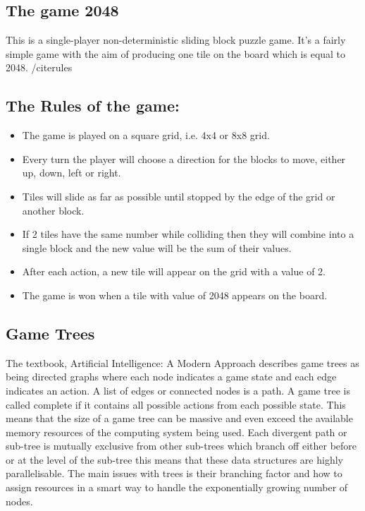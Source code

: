 \documentclass[a4paper]{article}
\begin{document}
\subsection{The game 2048}
This is a single-player non-deterministic sliding block puzzle game. It’s a fairly simple game with the aim of producing one tile on the board which is equal to 2048. /cite{rules}

\subsection{The Rules of the game:}
	\begin{itemize}
		\item The game is played on a square grid, i.e. 4x4 or 8x8 grid.
		\item Every turn the player will choose a direction for the blocks to move, either up, down, left or right.
		\item Tiles will slide as far as possible until stopped by the edge of the grid or another block. 
		\item If 2 tiles have the same number while colliding then they will combine into a single block and the new value will be the sum of their values.
		\item After each action, a new tile will appear on the grid with a value of 2.
		\item The game is won when a tile with value of 2048 appears on the board. 
	\end{itemize}

\subsection{Game Trees}
The textbook, Artificial Intelligence: A Modern Approach \cite{AIModern} describes game trees as being directed graphs where each node indicates a game state and each edge indicates an action. A list of edges or connected nodes is a path. A game tree is called complete if it contains all possible actions from each possible state. This means that the size of a game tree can be massive and even exceed the available memory resources of the computing system being used. Each divergent path or sub-tree is mutually exclusive from other sub-trees which branch off either before or at the level of the sub-tree this means that these data structures are highly parallelisable. The main issues with trees is their branching factor and how to assign resources in a smart way to handle the exponentially growing number of nodes.
\end{document}

